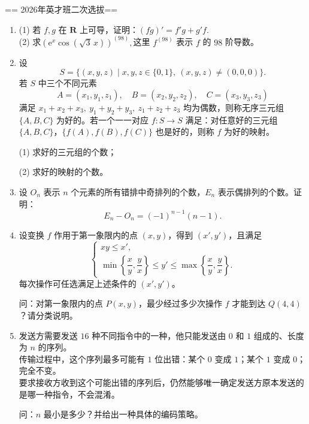 
== 2026年英才班二次选拔==
\begin{enumerate}
    \item 
    (1) 若 \(f,g\) 在 \(\mathbf{R}\) 上可导，证明：$(fg)' = f'g + g'f.$\\
    (2) 求$\left(\mathrm{e}^{x}\cos(\sqrt{3}\,x)\right)^{(98)},$这里 \(f^{(98)}\) 表示 \(f\) 的 \(98\) 阶导数。

    \item
    设
    \[
        S = \{(x,y,z)\mid x,y,z\in\{0,1\},\ (x,y,z)\ne(0,0,0)\}.
    \]
    若 \(S\) 中三个不同元素
    \[
        A=(x_1,y_1,z_1),\quad B=(x_2,y_2,z_2),\quad C=(x_3,y_3,z_3)
    \]
    满足 \(x_1+x_2+x_3,\ y_1+y_2+y_3,\ z_1+z_2+z_3\) 均为偶数，则称无序三元组 \(\{A,B,C\}\) 为好的。若一个一一对应 \(f:S\to S\) 满足：对任意好的三元组 \(\{A,B,C\}\)，\(\{f(A),f(B),f(C)\}\) 也是好的，则称 \(f\) 为好的映射。

    (1) 求好的三元组的个数；

    (2) 求好的映射的个数。

    \item
    设 \(O_n\) 表示 \(n\) 个元素的所有错排中奇排列的个数，\(E_n\) 表示偶排列的个数。证明：
    \[
        E_n - O_n = (-1)^{n-1}(n-1).
    \]

    \item
    设变换 \(f\) 作用于第一象限内的点 \((x,y)\)，得到 \((x',y')\)，且满足
    \[
        \begin{cases}
            xy \le x', \\[0.2em]
            \min\left\{\dfrac{x}{y},\dfrac{y}{x}\right\} \le y' \le \max\left\{\dfrac{x}{y},\dfrac{y}{x}\right\}.
        \end{cases}
    \]
    每次操作可任选满足上述条件的 \((x',y')\)。

    问：对第一象限内的点 \(P(x,y)\)，最少经过多少次操作 \(f\) 才能到达 \(Q(4,4)\)？请分类说明。

    \item
    发送方需要发送 \(16\) 种不同指令中的一种，他只能发送由 \(0\) 和 \(1\) 组成的、长度为 \(n\) 的序列。
    \\传输过程中，这个序列最多可能有 \(1\) 位出错：某个 \(0\) 变成 \(1\)；某个 \(1\) 变成 \(0\)；完全不变。
    \\要求接收方收到这个可能出错的序列后，仍然能够唯一确定发送方原本发送的是哪一种指令，不会混淆。

    问：\(n\) 最小是多少？并给出一种具体的编码策略。
\end{enumerate}


